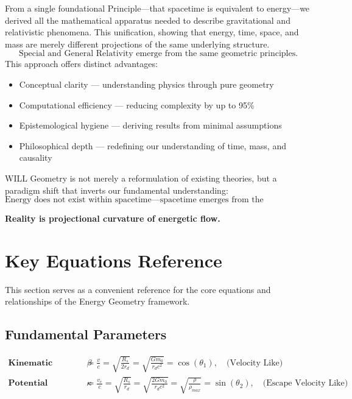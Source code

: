\documentclass[12pt, a4paper]{article}
\begin{document}
From a single foundational Principle—that spacetime is equivalent to energy—we derived all the mathematical apparatus needed to describe gravitational and relativistic phenomena. This unification, showing that energy, time, space, and mass are merely different projections of the same underlying structure.
\[
\boxed{\text{Special and General Relativity emerge from the same geometric principles.}}
\]
This approach offers distinct advantages:
\begin{itemize}
\item Conceptual clarity — understanding physics through pure geometry
\item Computational efficiency — reducing complexity by up to 95\%
\item Epistemological hygiene — deriving results from minimal assumptions
\item Philosophical depth — redefining our understanding of time, mass, and causality
\end{itemize}

WILL Geometry is not merely a reformulation of existing theories, but a paradigm shift that inverts our fundamental understanding: 
\[
\boxed{\text{Energy does not exist within spacetime—spacetime emerges from the transformations of energy.}}
\]
\begin{tcolorbox}[colback=gray!5, colframe=black!80!black, title=Final Principle]
\textbf{Reality is projectional curvature of energetic flow.}
\end{tcolorbox}

\section{Key Equations Reference}

This section serves as a convenient reference for the core equations and relationships of the Energy Geometry framework.

\subsection{Fundamental Parameters}

\begin{align}
   \textbf{Kinematic projection} \quad  \beta &=  \frac{v}{c} = \sqrt{\frac{R_s}{2r_{d}}} = \sqrt{\frac{Gm_0}{r_{d}c^2}} = \cos\left(\theta_1\right), \quad \text{(Velocity Like)} \\
 \textbf{Potential projection} \quad  \kappa &= \frac{v_e}{c} = \sqrt{\frac{R_s}{r_{d}}} = \sqrt{\frac{2Gm_0}{r_{d}c^2}} = \sqrt{\frac{\rho}{\rho_{max}}}= \sin\left(\theta_2\right),\quad \text{(Escape Velocity Like)}
\end{align}
\end{document}
